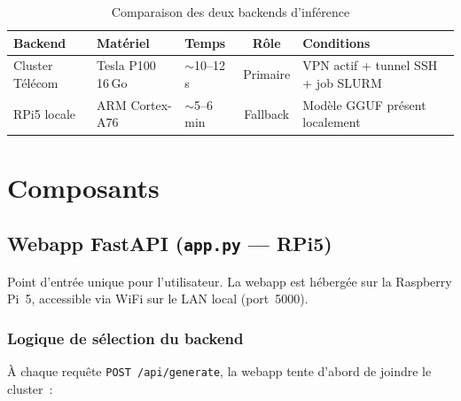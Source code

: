 \documentclass[a4paper,11pt]{article}
\newcommand{\file}[1]{\texttt{#1}}
\newcommand{\apiep}[1]{\texttt{#1}}
\begin{document}
\begin{table}[H]
\centering
\caption{Comparaison des deux backends d'inférence}
\label{tab:backends}
\begin{tabularx}{\textwidth}{@{}l l l c X@{}}
\toprule
\textbf{Backend} & \textbf{Matériel} & \textbf{Temps} & \textbf{Rôle} & \textbf{Conditions} \\
\midrule
Cluster Télécom & Tesla P100 16\,Go & $\sim$10--12\,s & Primaire & VPN actif + tunnel SSH + job SLURM \\
RPi5 locale & ARM Cortex-A76 & $\sim$5--6\,min & Fallback & Modèle GGUF présent localement \\
\bottomrule
\end{tabularx}
\end{table}

\section{Composants}
\label{sec:components}

\subsection{Webapp FastAPI (\file{app.py} --- RPi5)}
\label{sec:webapp}

Point d'entrée unique pour l'utilisateur. La webapp est hébergée sur la
Raspberry Pi~5, accessible via WiFi sur le LAN local (port~5000).

\subsubsection{Logique de sélection du backend}

À chaque requête \apiep{POST /api/generate}, la webapp tente d'abord
de joindre le cluster~:
\end{document}
